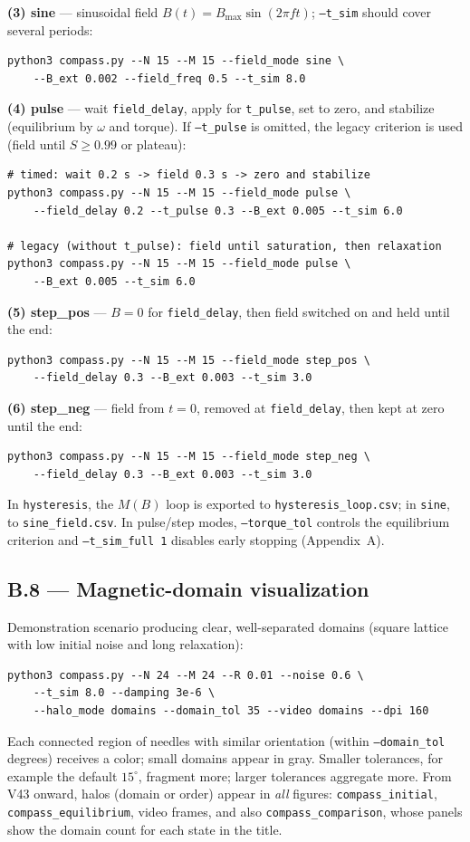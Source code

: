 \documentclass[11pt,a4paper]{article}
\newcommand{\code}[1]{\texttt{#1}}
\begin{document}
\noindent\textbf{(3) sine} --- sinusoidal field $B(t) = B_{\max}\sin(2\pi f t)$; \code{--t\_sim} should cover several periods:
\begin{verbatim}
python3 compass.py --N 15 --M 15 --field_mode sine \
    --B_ext 0.002 --field_freq 0.5 --t_sim 8.0
\end{verbatim}

\noindent\textbf{(4) pulse} --- wait \code{field\_delay}, apply for \code{t\_pulse}, set to zero, and stabilize (equilibrium by $\omega$ and torque). If \code{--t\_pulse} is omitted, the legacy criterion is used (field until $S \geq 0.99$ or plateau):
\begin{verbatim}
# timed: wait 0.2 s -> field 0.3 s -> zero and stabilize
python3 compass.py --N 15 --M 15 --field_mode pulse \
    --field_delay 0.2 --t_pulse 0.3 --B_ext 0.005 --t_sim 6.0

# legacy (without t_pulse): field until saturation, then relaxation
python3 compass.py --N 15 --M 15 --field_mode pulse \
    --B_ext 0.005 --t_sim 6.0
\end{verbatim}

\noindent\textbf{(5) step\_pos} --- $B{=}0$ for \code{field\_delay}, then field switched on and held until the end:
\begin{verbatim}
python3 compass.py --N 15 --M 15 --field_mode step_pos \
    --field_delay 0.3 --B_ext 0.003 --t_sim 3.0
\end{verbatim}

\noindent\textbf{(6) step\_neg} --- field from $t{=}0$, removed at \code{field\_delay}, then kept at zero until the end:
\begin{verbatim}
python3 compass.py --N 15 --M 15 --field_mode step_neg \
    --field_delay 0.3 --B_ext 0.003 --t_sim 3.0
\end{verbatim}

\noindent In \code{hysteresis}, the $M(B)$ loop is exported to \code{hysteresis\_loop.csv}; in \code{sine}, to \code{sine\_field.csv}. In pulse/step modes, \code{--torque\_tol} controls the equilibrium criterion and \code{--t\_sim\_full 1} disables early stopping (Appendix~A).

\subsection*{B.8 --- Magnetic-domain visualization}

Demonstration scenario producing clear, well-separated domains (square lattice with low initial noise and long relaxation):
\begin{verbatim}
python3 compass.py --N 24 --M 24 --R 0.01 --noise 0.6 \
    --t_sim 8.0 --damping 3e-6 \
    --halo_mode domains --domain_tol 35 --video domains --dpi 160
\end{verbatim}
Each connected region of needles with similar orientation (within \code{--domain\_tol} degrees) receives a color; small domains appear in gray. Smaller tolerances, for example the default $15^\circ$, fragment more; larger tolerances aggregate more. From V43 onward, halos (domain or order) appear in \emph{all} figures: \code{compass\_initial}, \code{compass\_equilibrium}, video frames, and also \code{compass\_comparison}, whose panels show the domain count for each state in the title.
\end{document}
